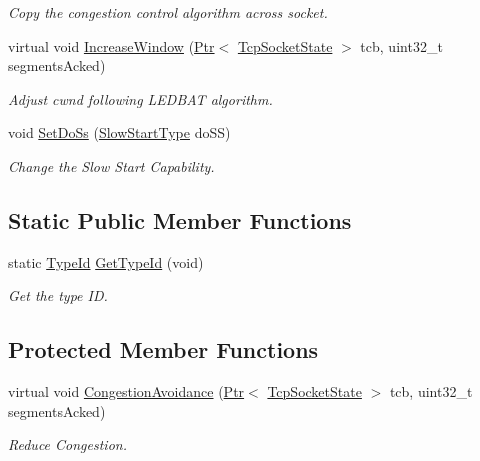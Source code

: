 \begin{DoxyCompactItemize}
\begin{DoxyCompactList}\small\item\em Copy the congestion control algorithm across socket. \end{DoxyCompactList}\item 
virtual void \hyperlink{classns3_1_1TcpLedbat_a9baf3c7c8d5572c3cf7c4249a2833748}{Increase\+Window} (\hyperlink{classns3_1_1Ptr}{Ptr}$<$ \hyperlink{classns3_1_1TcpSocketState}{Tcp\+Socket\+State} $>$ tcb, uint32\+\_\+t segments\+Acked)
\begin{DoxyCompactList}\small\item\em Adjust cwnd following L\+E\+D\+B\+AT algorithm. \end{DoxyCompactList}\item 
void \hyperlink{classns3_1_1TcpLedbat_a3d0596a0f90e3b199451a36f310ef71d}{Set\+Do\+Ss} (\hyperlink{classns3_1_1TcpLedbat_a7099bb59b406b311fab27960df7c8620}{Slow\+Start\+Type} do\+SS)
\begin{DoxyCompactList}\small\item\em Change the Slow Start Capability. \end{DoxyCompactList}\end{DoxyCompactItemize}
\subsection*{Static Public Member Functions}
\begin{DoxyCompactItemize}
\item 
static \hyperlink{classns3_1_1TypeId}{Type\+Id} \hyperlink{classns3_1_1TcpLedbat_a3b7785bb378bd0af12ac9d2f9af330db}{Get\+Type\+Id} (void)
\begin{DoxyCompactList}\small\item\em Get the type ID. \end{DoxyCompactList}\end{DoxyCompactItemize}
\subsection*{Protected Member Functions}
\begin{DoxyCompactItemize}
\item 
virtual void \hyperlink{classns3_1_1TcpLedbat_a592b6df30581c978ddabf095eb0300c6}{Congestion\+Avoidance} (\hyperlink{classns3_1_1Ptr}{Ptr}$<$ \hyperlink{classns3_1_1TcpSocketState}{Tcp\+Socket\+State} $>$ tcb, uint32\+\_\+t segments\+Acked)
\begin{DoxyCompactList}\small\item\em Reduce Congestion. \end{DoxyCompactList}\end{DoxyCompactItemize}
